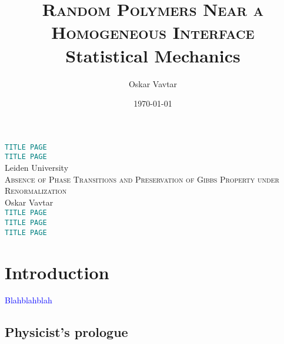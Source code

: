 \documentclass[12pt]{article}
\title{\textsc{Random Polymers Near a Homogeneous Interface}\\\vspace{0.3cm}\small{Statistical Mechanics}\vspace{-0.7cm}}
\author{Oskar Vavtar}
\date{\today}
\newcommand{\1}{\mathbbm{1}}
\newcommand{\5}{\vspace{0.5cm}}
\theoremstyle{definition}
\begin{document}
\begin{center}
\Huge{\textcolor{teal}{\texttt{TITLE PAGE}}} \\
\vspace{2cm}
\Huge{\textcolor{teal}{\texttt{TITLE PAGE}}} \\
\vspace{2cm}
Leiden University \\
\vspace{2cm}
{\textsc{Absence of Phase Transitions and Preservation of Gibbs Property under Renormalization}} \\
\vspace{2cm}
Oskar Vavtar \\
\vspace{2cm}
\Huge{\textcolor{teal}{\texttt{TITLE PAGE}}} \\
\vspace{2cm}
\Huge{\textcolor{teal}{\texttt{TITLE PAGE}}} \\
\vspace{2cm}
\Huge{\textcolor{teal}{\texttt{TITLE PAGE}}}
\end{center}
\pagebreak
\tableofcontents
\pagebreak


\section{Introduction}

\textcolor{blue}{Blahblahblah}


\subsection{Physicist's prologue}
\end{document}
